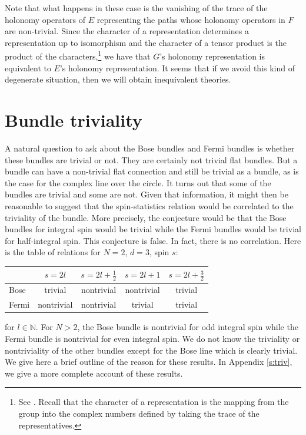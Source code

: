 \documentclass[11pt]{article}
\theoremstyle{remark}
\begin{document}
Note
that what happens in these case is  the vanishing of 
the trace of the holonomy operators of $E$
representing  the paths whose holonomy operators in $F$  are
 non-trivial.
 Since the character of a
representation determines a representation up to
isomorphism 
and the
character of a tensor product is the product of the
characters,\footnote{See \cite{BrDi}. Recall that the character of a 
representation is the mapping from the group into the complex numbers
defined by taking the trace of the representatives.} we have that
$G$'s holonomy representation is
 equivalent to $E$'s holonomy representation.
It seems that if we avoid this kind of degenerate situation, 
then we will obtain inequivalent
theories. 


\section{Bundle triviality}

A natural question to ask about the Bose bundles and Fermi bundles is
whether these bundles are trivial or not. 
They are certainly not trivial flat
bundles. But a bundle can have a non-trivial flat connection and still
be trivial as a bundle, 
as is the case for the complex line over the circle. It
turns out that some of the bundles are trivial and some are not. Given
that information, it might then be reasonable to suggest that the
spin-statistics relation would be correlated to the triviality of the
bundle. More precisely, the conjecture would be that 
 the Bose bundles for integral spin
 would be trivial while the Fermi bundles would
be trivial for half-integral spin. This conjecture is false. In
fact, there is no correlation. Here is the table of relations for
$N=2$, $d =3$, spin $s$:
\begin{center}
\begin{tabular}{|l|c|c|c|c|}
\hline
 & $s=2l$  &  $s=2l+\frac{1}{2}$ &  $s=2l+1$ &  $s=2l+\frac{3}{2}$\\
\hline
Bose & trivial & nontrivial & nontrivial & trivial \\
Fermi  & nontrivial & nontrivial & trivial & trivial\\
\hline
\end{tabular}
\end{center}
for $l \in \mathbb{N}$. 
For $N > 2$, the Bose bundle  is nontrivial for odd integral spin while 
the Fermi bundle is nontrivial for even integral spin. We do not know the 
triviality or nontriviality of the other bundles except for the Bose
line which is clearly trivial. We give here a
 brief outline of the reason for these
results. In Appendix \ref{s:triv}, we give a more complete account of these
results.
\end{document}
